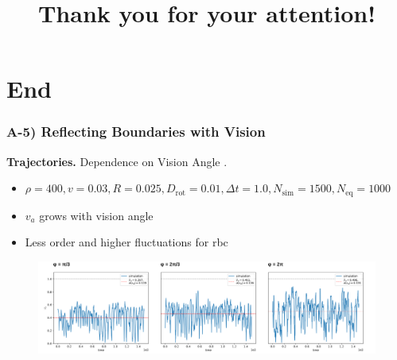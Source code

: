 \documentclass[11pt,t,usepdftitle=false,aspectratio=169]{beamer}
\begin{document}
	
	
	
	
	
	
		
	\title{Thank you for your attention!}
	\subtitle{}
	\section{End}
	
	\appendix
	
	\begin{frame}
		\frametitle{A-5) Reflecting Boundaries with Vision}
		\textbf{Trajectories.} Dependence on Vision Angle .
		\begin{itemize}
	    	\item $\rho = 400, v = 0.03, R = 0.025, D_{\text{rot}} = 0.01, \Delta t = 1.0, N_{\text{sim}} = 1500, N_{\text{eq}} = 1000$
	    	\item $v_a$ grows with vision angle
	    	\item Less order and higher fluctuations for rbc
		\end{itemize}
		\begin{figure}[H]
  			\includegraphics[width=\textwidth]{images/chapter5/trajectory_comp_N_20_L_1.000000_v_0.030000_R_0.030000_D_0.010000.png} 
		\end{figure}
	\end{frame}
\end{document}
